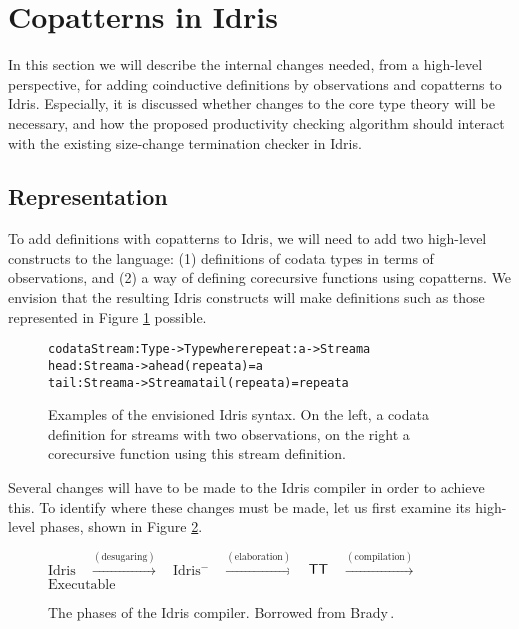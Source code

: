 \section{Copatterns in Idris}
\label{sec:copatterns_in_idris}
In this section we will describe the internal changes needed, from a high-level perspective, for adding coinductive definitions by observations and copatterns to Idris. Especially, it is discussed whether changes to the core type theory will be necessary, and how the proposed productivity checking algorithm should interact with the existing size-change termination checker in Idris.

\subsection{Representation}
To add definitions with copatterns to Idris, we will need to add two high-level constructs to the language: (1) definitions of codata types in terms of observations, and (2) a way of defining corecursive functions using copatterns. We envision that the resulting Idris constructs will make definitions such as those represented in Figure \ref{fig:envisioned_copattern_syntax} possible.

\begin{figure}
\begin{alltt}
codata Stream : Type -> Type where             repeat : a -> Stream a
  head : Stream a -> a                         head (repeat a) = a
  tail : Stream a -> Stream a                  tail (repeat a) = repeat a
\end{alltt}
\caption{Examples of the envisioned Idris syntax. On the left, a codata definition for streams with two observations, on the right a corecursive function using this stream definition.}
\label{fig:envisioned_copattern_syntax}
\end{figure}

Several changes will have to be made to the Idris compiler in order to achieve this. To identify where these changes must be made, let us first examine its high-level phases, shown in Figure \ref{fig:Idris_compiler_phases}.

\begin{figure}
\begin{center}
$\mbox{Idris}$
$\;$
$\xrightarrow{\mathrm{ (desugaring) }}$
$\;$
$\mbox{Idris$^-$}$
$\;$
$\xrightarrow{\mathrm{ (elaboration) }}$
$\;$
$\mbox{\textsf{TT}{}}$
$\;$
$\xrightarrow{\mathrm{ (compilation) }}$
$\;$
$\mbox{Executable}$
\end{center}
\caption{The phases of the Idris compiler. Borrowed from Brady\,\citep{BradyIdrisImpl13}.}
\label{fig:Idris_compiler_phases}
\end{figure}

